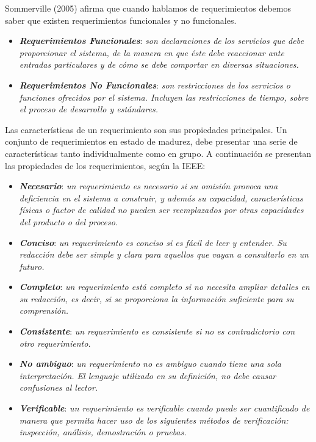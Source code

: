 \documentclass[11pt,oneside]{book}
\begin{document}
Sommerville (2005) afirma que cuando hablamos de requerimientos debemos saber que existen requerimientos funcionales y no funcionales.
\begin{itemize}
\item \textbf{\textit{Requerimientos Funcionales}}: \textit{son declaraciones de los servicios que debe proporcionar el sistema, de la manera en que éste debe reaccionar ante entradas particulares y de cómo se debe comportar en diversas situaciones.} 
\item \textbf{\textit{Requerimientos No Funcionales}}: \textit{son restricciones de los servicios o funciones ofrecidos por el sistema. Incluyen las restricciones de tiempo, sobre el proceso de desarrollo y estándares.}
\end{itemize}

Las características de un requerimiento son sus propiedades principales. Un conjunto de requerimientos en estado de madurez, debe presentar una serie de características tanto individualmente como en grupo. A continuación se presentan las propiedades de los requerimientos, según la IEEE:
\begin{itemize}
\item \textit{\textbf{Necesario}}: \textit{un requerimiento es necesario si su omisión provoca una deficiencia en el sistema a construir, y además su capacidad, características físicas o factor de calidad no pueden ser reemplazados por otras capacidades del producto o del proceso.}

\item \textit{\textbf{Conciso}}: \textit{un requerimiento es conciso si es fácil de leer y entender. Su redacción debe ser simple y clara para aquellos que vayan a consultarlo en un futuro.}

\item \textit{\textbf{Completo}}: \textit{un requerimiento está completo si no necesita ampliar detalles en su redacción, es decir, si se proporciona la información suficiente para su comprensión.}

\item \textit{\textbf{Consistente}}: \textit{un requerimiento es consistente si no es contradictorio con otro requerimiento.}

\item \textit{\textbf{No ambiguo}}: \textit{un requerimiento no es ambiguo cuando tiene una sola interpretación. El lenguaje utilizado en su definición, no debe causar confusiones al lector.}

\item \textit{\textbf{Verificable}}: \textit{un requerimiento es verificable cuando puede ser cuantificado de manera que permita hacer uso de los siguientes métodos de verificación: inspección, análisis, demostración o pruebas.}
\end{itemize}
\end{document}
